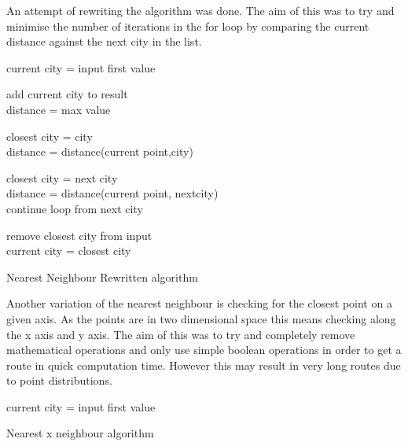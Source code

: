 \documentclass[conference,backref=page]{acmsiggraph}
\begin{document}
An attempt of rewriting the algorithm was done. The aim of this was to try and minimise the number of iterations in the for loop by comparing the current distance against the next city in the list.
\begin{algorithm}
	current city = input first value\\
	{
		add current city to result\\
		distance = max value\\
		{
			{
				closest city = city\\
				distance = distance(current point,city)\\
			}
			{
				{
					
					closest city = next city \\
					distance = distance(current point, nextcity)\\
					continue loop from next city\\
				}
			}
		}
		remove closest city from input\\
		current city = closest city\\
	}
	\caption{Nearest Neighbour Rewritten algorithm}
\end{algorithm}



Another variation of the nearest neighbour is checking for the closest point on a given axis. As the points are in two dimensional space this means checking along the x axis and y axis. The aim of this was to try and completely remove mathematical operations and only use simple boolean operations in order to get a route in quick computation time. However this may result in very long routes due to point distributions.

\begin{algorithm}
	current city = input first value\\
	\caption{Nearest x neighbour algorithm}
\end{algorithm}
\end{document}
